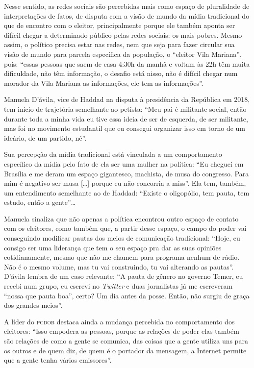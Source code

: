 Nesse sentido, as redes sociais são percebidas mais como espaço de
pluralidade de interpretações de fatos, de disputa com a visão de mundo
da mídia tradicional do que de encontro com o eleitor, principalmente
porque ele também aponta ser difícil chegar a determinado público pelas
redes sociais: os mais pobres. Mesmo assim, o político precisa estar nas
redes, nem que seja para fazer circular sua visão de mundo para parcela
específica da população, o ``eleitor Vila Mariana'', pois: ``essas
pessoas que saem de casa 4:30h da manhã e voltam às 22h têm muita
dificuldade, não têm informação, o desafio está nisso, não é difícil
chegar num morador da Vila Mariana as informações, ele tem as
informações''.

Manuela D'ávila, vice de Haddad na disputa à presidência da República em
2018, tem início de trajetória semelhante ao petista: ``Meu pai é
militante social, então durante toda a minha vida eu tive essa ideia de
ser de esquerda, de ser militante, mas foi no movimento estudantil que
eu consegui organizar isso em torno de um ideário, de um partido, né''.

Sua percepção da mídia tradicional está vinculada a um comportamento
específico da mídia pelo fato de ela ser uma mulher na política: ``Eu
cheguei em Brasília e me deram um espaço gigantesco, machista, de musa
do congresso. Para mim é negativo ser musa {[}\ldots{}{]} porque eu não
concorria a miss''. Ela tem, também, um entendimento semelhante ao de
Haddad: ``Existe o oligopólio, tem pauta, tem estudo, então a gente''\ldots{}

Manuela sinaliza que não apenas a política encontrou outro espaço de
contato com os eleitores, como também que, a partir desse espaço, o
campo do poder vai conseguindo modificar pautas dos meios de comunicação
tradicional: ``Hoje, eu consigo ser uma liderança que tem o seu espaço
pra dar as suas opiniões cotidianamente, mesmo que não me chamem para
programa nenhum de rádio. Não é o mesmo volume, mas tu vai construindo,
tu vai alterando as pautas''. D'ávila lembra de um caso relevante: ``A
pauta de gênero no governo Temer, eu recebi num grupo, eu escrevi no
\emph{Twitter} e duas jornalistas já me escreveram ``nossa que pauta
boa'', certo? Um dia antes da posse. Então, não surgiu de graça dos
grandes meios''.

A líder do \textsc{pcdob} destaca ainda a mudança percebida no comportamento
dos eleitores: ``Isso empodera as pessoas, porque as relações de poder
elas também são relações de como a gente se comunica, das coisas que a
gente utiliza uns para os outros e de quem diz, de quem é o portador da
mensagem, a Internet permite que a gente tenha vários emissores''.

